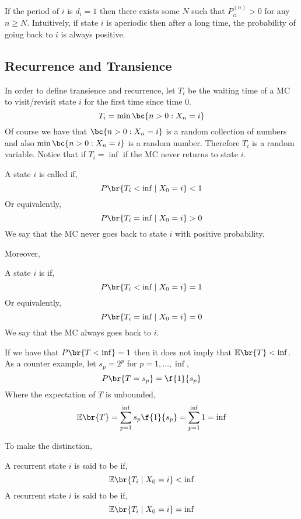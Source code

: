 \documentclass{article}
\newcommand{\Exp}{\mathbb{E}}
\begin{document}
\begin{remark}
    If the period of $i$ is $d_i = 1$ then there exists some $N$ such that $P_{ii}^{(n)} > 0$ for any $n \geq N$. Intuitively, if state $i$ is aperiodic then after a long time, the probability of going back to $i$ is always positive.
\end{remark}

\subsection{Recurrence and Transience}
In order to define transience and recurrence, let $T_i$ be the waiting time of a MC to visit/revisit state $i$ for the first time since time $0$.
\[ T_i = \min \bc{n > 0 : X_n = i} \]
Of course we have that $\bc{n > 0 : X_n = i}$ is a random collection of numbers and also $\min\bc{n > 0 : X_n = i}$ is a random number. Therefore $T_i$ is a random variable. Notice that if $T_i = \inf$ if the MC never returns to state $i$.
\begin{definition}
    A state $i$ is called  if,
    \[ P\br{T_i < \inf \mid X_0 = i} < 1 \]
    Or equivalently,
    \[ P\br{T_i = \inf \mid X_0 = i} > 0 \]
    We say that the MC never goes back to state $i$ with positive probability.
\end{definition}
Moreover,
\begin{definition}
    A state $i$ is  if,
    \[ P\br{T_i < \inf \mid X_0 = i} = 1 \]
    Or equivalently,
    \[ P\br{T_i = \inf \mid X_0 = i} = 0 \]
    We say that the MC always goes back to $i$.
\end{definition}
\begin{remark}
    If we have that $P\br{T < \inf} = 1$ then it does not imply that $\Exp\br{T} < \inf$. As a counter example, let $s_p = 2^{p}$ for $p = 1, \ldots, \inf$,
    \[ P\br{T = s_p} = \f{1}{s_p} \]
    Where the expectation of $T$ is unbounded,
    \[ \Exp\br{T} = \sum_{p=1}^{\inf} s_p \f{1}{s_p} = \sum_{p=1}^{\inf} 1 = \inf \]
\end{remark}
To make the distinction,
\begin{definition}
    A recurrent state $i$ is said to be  if,
    \[ \Exp\br{T_i \mid X_0 = i} < \inf \]
    A recurrent state $i$ is said to be  if,
    \[ \Exp\br{T_i \mid X_0 = i} = \inf \]
\end{definition}
\end{document}
